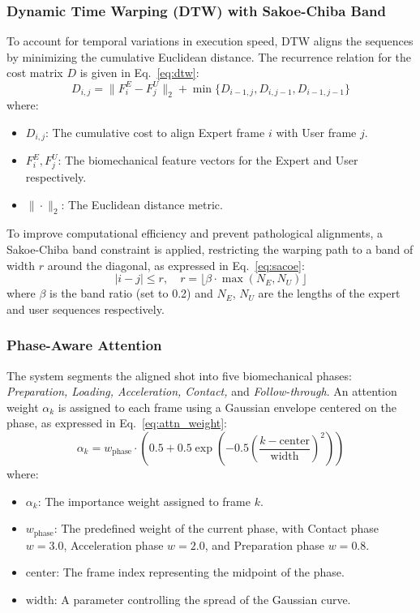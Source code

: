\documentclass[pdflatex,sn-mathphys-num]{sn-jnl}
\theoremstyle{thmstyleone}%
\theoremstyle{thmstyletwo}%
\theoremstyle{thmstylethree}%
\begin{document}
\subsubsection{Dynamic Time Warping (DTW) with Sakoe-Chiba Band}
To account for temporal variations in execution speed, DTW aligns the sequences by minimizing the cumulative Euclidean distance. The recurrence relation for the cost matrix $D$ is given in Eq.~\eqref{eq:dtw}:
\begin{equation}
D_{i,j} = \|F_{i}^{E} - F_{j}^{U}\|_2 + \min\{D_{i-1,j}, D_{i,j-1}, D_{i-1,j-1}\}
\label{eq:dtw}
\end{equation}
\noindent where:
\begin{itemize}
    \item $D_{i,j}$: The cumulative cost to align Expert frame $i$ with User frame $j$.
    \item $F_{i}^{E}, F_{j}^{U}$: The biomechanical feature vectors for the Expert and User respectively.
    \item $\|\cdot\|_2$: The Euclidean distance metric.
\end{itemize}

To improve computational efficiency and prevent pathological alignments, a Sakoe-Chiba band constraint \cite{b42} is applied, restricting the warping path to a band of width $r$ around the diagonal, as expressed in Eq.~\eqref{eq:sacoe}:
\begin{equation}
|i - j| \le r, \quad r = \lfloor \beta \cdot \max(N_E, N_U) \rfloor
\label{eq:sacoe}
\end{equation}
\noindent where $\beta$ is the band ratio (set to 0.2) and $N_E$, $N_U$ are the lengths of the expert and user sequences respectively.

\subsubsection{Phase-Aware Attention}
The system segments the aligned shot into five biomechanical phases: \textit{Preparation, Loading, Acceleration, Contact,} and \textit{Follow-through}. An attention weight $\alpha_k$ is assigned to each frame using a Gaussian envelope centered on the phase, as expressed in Eq.~\eqref{eq:attn_weight}:
\begin{equation}
\alpha_{k} = w_{\text{phase}} \cdot \left(0.5 + 0.5\exp\left(-0.5\left(\frac{k-\text{center}}{\text{width}}\right)^{2}\right)\right)
\label{eq:attn_weight}
\end{equation}
\noindent where:
\begin{itemize}
    \item $\alpha_k$: The importance weight assigned to frame $k$.
    \item $w_{\text{phase}}$: The predefined weight of the current phase, with Contact phase $w=3.0$, Acceleration phase $w=2.0$, and Preparation phase $w=0.8$.
    \item $\text{center}$: The frame index representing the midpoint of the phase.
    \item $\text{width}$: A parameter controlling the spread of the Gaussian curve.
\end{itemize}
\end{document}
